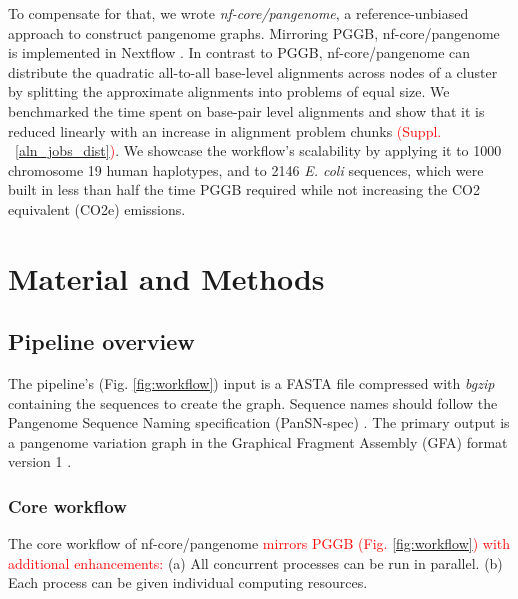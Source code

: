 \documentclass{bioinfo}
\theoremstyle{definition}
\newcommand{\red}[1]{{\textcolor{Red}{#1}}}
\begin{document}
	To compensate for that, we wrote \textit{nf-core/pangenome}, a reference-unbiased approach to construct pangenome graphs. 
	Mirroring PGGB, nf-core/pangenome is implemented in Nextflow \citep{DiTommaso2017}.
	In contrast to PGGB, nf-core/pangenome can distribute the quadratic all-to-all base-level alignments across nodes of a cluster by splitting the approximate alignments into problems of equal size. 
	We benchmarked the time spent on base-pair level alignments and show that it is reduced linearly with an increase in alignment problem chunks \red{(Suppl. ~\ref{aln_jobs_dist})}. 
	We showcase the workflow’s scalability by applying it to 1000 chromosome 19 human haplotypes, and to 2146 \textit{E. coli} sequences, which were built in less than half the time PGGB required while not increasing the CO2 equivalent (CO2e) emissions.
	\vspace{-0.6cm}
	\section{Material and Methods}
	
	\subsection{Pipeline overview}
	The pipeline’s (Fig. \ref{fig:workflow}) input is a FASTA file compressed with \textit{bgzip} \citep{Li2009} containing the sequences to create the graph. 
	Sequence names should follow the Pangenome Sequence Naming specification (PanSN-spec) \citep{pansn-spec}. 
	The primary output is a pangenome variation graph \citep{Garrison:2018} in the Graphical Fragment Assembly (GFA) format version 1 \citep{GFA}.
	
	

	\subsubsection{Core workflow}
	
	The core workflow of nf-core/pangenome \red{mirrors}\red{ PGGB (Fig. \ref{fig:workflow}) with additional enhancements:} (a) All concurrent processes can be run in parallel. (b) Each process can be given individual computing resources.
	
\end{document}
